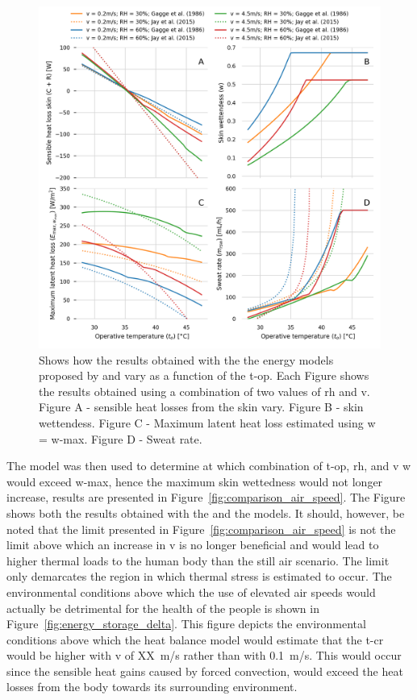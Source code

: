 \begin{figure}
    \centering
    \includegraphics[width=\textwidth]{figures/comparison_models_v2.png}
    \caption{Shows how the results obtained with the the energy models proposed by  and  vary as a function of the \ac{t-op}.
    Each Figure shows the results obtained using a combination of two values of \ac{rh} and \ac{v}.
    Figure A - sensible heat losses from the skin vary.
    Figure B - skin wettendess.
    Figure C - Maximum latent heat loss estimated using \ac{w} = \ac{w-max}.
    Figure D - Sweat rate.}
    \label{fig:comparison_models}
\end{figure}

The  model was then used to determine at which combination of \ac{t-op}, \ac{rh}, and \ac{v} \ac{w} would exceed \ac{w-max}, hence the maximum skin wettedness would not longer increase, results are presented in Figure~\ref{fig:comparison_air_speed}.
The Figure shows both the results obtained with the and the  models.
It should, however, be noted that the limit presented in Figure~\ref{fig:comparison_air_speed} is not the limit above which an increase in \ac{v} is no longer beneficial and would lead to higher thermal loads to the human body than the still air scenario.
The limit only demarcates the region in which thermal stress is estimated to occur.
The environmental conditions above which the use of elevated air speeds would actually be detrimental for the health of the people is shown in Figure~\ref{fig:energy_storage_delta}.
This figure depicts the environmental conditions above which the heat balance model would estimate that the \ac{t-cr} would be higher with \ac{v} of XX~m/s rather than with 0.1~m/s.
This would occur since the sensible heat gains caused by forced convection, would exceed the heat losses from the body towards its surrounding environment.

